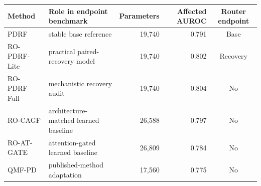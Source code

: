 \begin{tabular}{lp{}rrc}
\toprule
Method & Role in endpoint benchmark & Parameters & Affected AUROC & Router endpoint \\
\midrule
PDRF & stable base reference & 19,740 & 0.791 & Base \\
RO-PDRF-Lite & practical paired-recovery model & 19,740 & 0.802 & Recovery \\
RO-PDRF-Full & mechanistic recovery audit & 19,740 & 0.804 & No \\
RO-CAGF & architecture-matched learned baseline & 26,588 & 0.797 & No \\
RO-AT-GATE & attention-gated learned baseline & 26,809 & 0.784 & No \\
QMF-PD & published-method adaptation & 17,560 & 0.775 & No \\
\bottomrule
\end{tabular}
